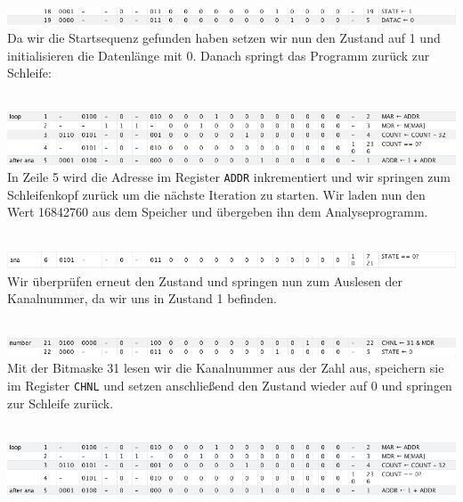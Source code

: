 \documentclass[12pt,titlepage]{article}
\begin{document}
\leavevmode \\
\includegraphics[width=16cm]{listing/row18-19.png}
\leavevmode \\

Da wir die Startsequenz gefunden haben setzen wir nun den Zustand auf 1 und initialisieren die Datenlänge mit 0. Danach springt
das Programm zurück zur Schleife:

\leavevmode \\
\includegraphics[width=16cm]{listing/row1-5.png}
\leavevmode \\

In Zeile 5 wird die Adresse im Register \texttt{ADDR} inkrementiert und wir springen zum Schleifenkopf zurück um die nächste
Iteration zu starten. Wir laden nun den Wert 16842760 aus dem Speicher und übergeben ihn dem Analyseprogramm.

\leavevmode \\
\includegraphics[width=16cm]{listing/row6.png}
\leavevmode \\

Wir überprüfen erneut den Zustand und springen nun zum Auslesen der Kanalnummer, da wir uns in Zustand 1 befinden.

\leavevmode \\
\includegraphics[width=16cm]{listing/row21-22.png}
\leavevmode \\

Mit der Bitmaske 31 lesen wir die Kanalnummer aus der Zahl aus, speichern sie im Register \texttt{CHNL}
und setzen anschließend den Zustand wieder auf 0 und springen zur Schleife
zurück.

\leavevmode \\
\includegraphics[width=16cm]{listing/row1-5.png}
\leavevmode \\
\end{document}
